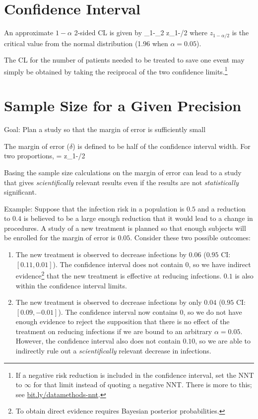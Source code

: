 \section{Confidence Interval}
An approximate $1-\alpha$ 2-sided CL is given by
\beq
{}_{1}-_{2} \pm z_{1-\alpha/2} \times{}
\eeq
where $z_{1-\alpha/2}$ is the critical value from the normal
distribution (1.96 when $\alpha=0.05$).

The CL for the number of patients needed to be treated to save one
event may simply be obtained by taking the reciprocal of the two
confidence limits.\footnote{If a negative risk reduction is included
  in the confidence interval, set the NNT to $\infty$ for that limit
  instead of quoting a negative NNT.  There is more to this; see \href{http://bit.ly/datamethods-nnt}{bit.ly/datamethods-nnt}.}

\section{Sample Size for a Given Precision}

\bi
 \item Goal: Plan a study so that the margin of error is sufficiently small
 \item The margin of error ($\delta$) is defined to be half of the confidence interval width.  For two proportions,
  \beq
  \delta = z_{1-\alpha/2} \times{}
  \eeq
 \item Basing the sample size calculations on the margin of error can lead to a study that gives \textit{scientifically} relevant results even if the results are not \textit{statistically} significant.
  \item Example: Suppose that the infection risk in a population is $0.5$ and a reduction to $0.4$ is believed to be a large enough reduction that it would lead to a change in procedures.  A study of a new treatment is planned so that enough subjects will be enrolled for the margin of error is $0.05$.  Consider these two possible outcomes:
  \begin{enumerate}
  \item The new treatment is observed to decrease infections by $0.06$ ($0.95$ CI: $[0.11, 0.01]$).  The confidence interval does not contain $0$, so we have indirect evidence\footnote{To obtain direct evidence requires Bayesian posterior probabilities.} that the new treatment is effective at reducing infections.  $0.1$ is also within the confidence interval limits.
  \item The new treatment is observed to decrease infections by only $0.04$ ($0.95$ CI: $[0.09, -0.01]$).  The confidence interval now contains $0$, so we do not have enough evidence to reject the supposition that there is no effect of the treatment on reducing infections if we are bound to an arbitrary $\alpha=0.05$. However, the confidence interval also does not contain $0.10$, so we are able to indirectly rule out a \textit{scientifically} relevant decrease in infections.
  \end{enumerate}


